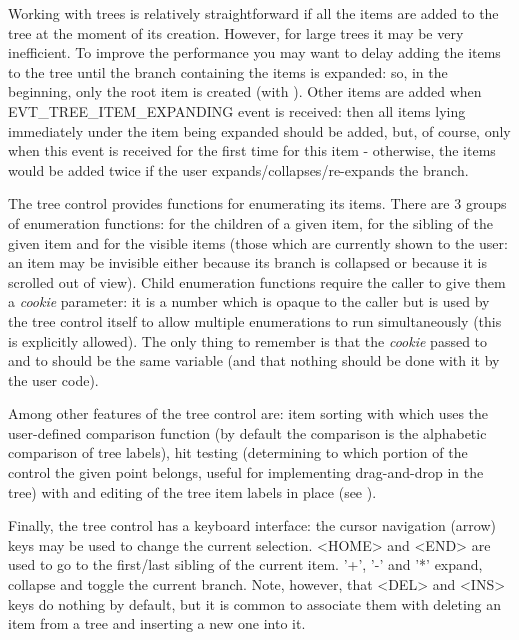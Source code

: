Working with trees is relatively straightforward if all the items are added to
the tree at the moment of its creation. However, for large trees it may be
very inefficient. To improve the performance you may want to delay adding the
items to the tree until the branch containing the items is expanded: so, in the
beginning, only the root item is created (with 
). Other items are added when
EVT\_TREE\_ITEM\_EXPANDING event is received: then all items lying immediately
under the item being expanded should be added, but, of course, only when this
event is received for the first time for this item - otherwise, the items would
be added twice if the user expands/collapses/re-expands the branch.

The tree control provides functions for enumerating its items. There are 3
groups of enumeration functions: for the children of a given item, for the
sibling of the given item and for the visible items (those which are currently
shown to the user: an item may be invisible either because its branch is
collapsed or because it is scrolled out of view). Child enumeration functions
require the caller to give them a {\it cookie} parameter: it is a number which
is opaque to the caller but is used by the tree control itself to allow
multiple enumerations to run simultaneously (this is explicitly allowed). The
only thing to remember is that the {\it cookie} passed to 
 and to 
 should be the same variable (and
that nothing should be done with it by the user code).

Among other features of the tree control are: item sorting with 
 which uses the user-defined comparison
function  (by default the
comparison is the alphabetic comparison of tree labels), hit testing
(determining to which portion of the control the given point belongs, useful
for implementing drag-and-drop in the tree) with 
 and editing of the tree item labels in
place (see ).

Finally, the tree control has a keyboard interface: the cursor navigation (arrow) keys
may be used to change the current selection. <HOME> and <END> are used to go to
the first/last sibling of the current item. '+', '-' and '*' expand, collapse
and toggle the current branch. Note, however, that <DEL> and <INS> keys do
nothing by default, but it is common to associate them with deleting an item from
a tree and inserting a new one into it.

